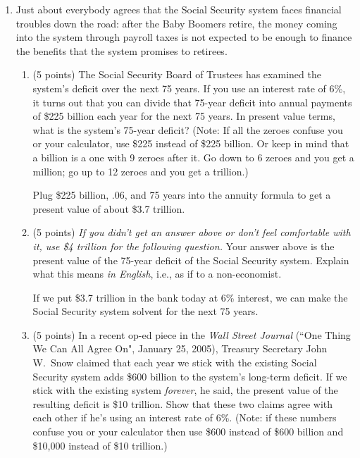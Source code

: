 \documentclass[twoside]{article}
\begin{document}
\begin{enumerate}
\item \begin{EXAM} Just about everybody agrees that the Social Security system faces financial troubles down the road: after the Baby Boomers retire, the money coming into the system through payroll taxes is not expected to be enough to finance the benefits that the system promises to retirees. \end{EXAM}

    \begin{enumerate}

    \item \begin{EXAM} (5 points) The Social Security Board of Trustees has examined the system's deficit over the next 75 years. If you use an interest rate of 6\%, it turns out that you can divide that 75-year deficit into annual payments of \$225 billion each year for the next 75 years. In present value terms, what is the system's 75-year deficit? (Note: If all the zeroes confuse you or your calculator, use \$225 instead of \$225 billion. Or keep in mind that a billion is a one with 9 zeroes after it. Go down to 6 zeroes and you get a million; go up to 12 zeroes and you get a trillion.) \vspace{2in} \end{EXAM}

\begin{KEY}
Plug \$225 billion, $.06$, and 75 years into the annuity formula to get a present value of about \$3.7 trillion.
\end{KEY}


    \item \begin{EXAM} (5 points) \emph{If you didn't get an answer above or don't feel comfortable with it, use \$4 trillion for the following question.} Your answer above is the present value of the 75-year deficit of the Social Security system. Explain what this means \emph{in English}, i.e., as if to a non-economist. \clearpage \end{EXAM}

\begin{KEY}
If we put \$3.7 trillion in the bank today at 6\% interest, we can make the Social Security system solvent for the next 75 years.
\end{KEY}

    \item \begin{EXAM} (5 points) In a recent op-ed piece in the \emph{Wall Street Journal} (``One Thing We Can All Agree On", January 25, 2005), Treasury Secretary John W.\ Snow claimed that each year we stick with the existing Social Security system adds \$600 billion to the system's long-term deficit. If we stick with the existing system \emph{forever}, he said, the present value of the resulting deficit is \$10 trillion. Show that these two claims agree with each other if he's using an interest rate of 6\%. (Note: if these numbers confuse you or your calculator then use \$600 instead of \$600 billion and \$10,000 instead of \$10 trillion.)  \vspace{1in} \end{EXAM}


\end{enumerate}
\end{enumerate}
\end{document}
